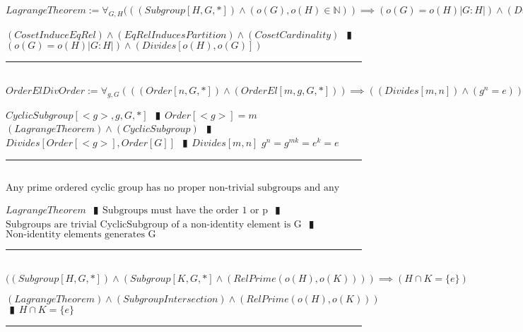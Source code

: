 \documentclass{book}
\newcommand{\abr}{:=}
\newcommand{\pipe}{$\phantom{(}\vrectangleblack\phantom{)}$}
\begin{document}
$LagrangeTheorem \abr \forall_{G, H}(((Subgroup[H, G, *]) \land (o(G), o(H) \in \mathbb{N})) \implies (o(G) = o(H) |G: H|) \land (Divides[o(H), o(G)])$
\begin{enumerate}
  \lit $(CosetInduceEqRel) \land (EqRelInducesPartition) \land (CosetCardinality)$ \pipe $(o(G) = o(H) |G: H|) \land (Divides[o(H), o(G)])$
\end{enumerate} \vspace{.75mm} \hrule \vspace{.75mm} \ \\ 

$OrderElDivOrder \abr \forall_{g, G}(((Order[n, G, *]) \land (OrderEl[m, g, G, *])) \implies ((Divides[m, n]) \land (g^n = e)))$
\begin{enumerate}
  \lit $CyclicSubgroup[<g>, g, G, *]$ \pipe $Order[<g>] = m$
  \lit $(LagrangeTheorem) \land (CyclicSubgroup)$ \pipe $Divides[Order[<g>], Order[G]]$ \pipe $Divides[m, n]$
  \lit $g^n = g^{m k} = e ^k = e$
\end{enumerate} \vspace{.75mm} \hrule \vspace{.75mm} \ \\ 

$\text{Any prime ordered cyclic group has no proper non-trivial subgroups and any non-identity element is a generator.}$
\begin{enumerate}
  \lit $LagrangeTheorem$ \pipe $\text{Subgroups must have the order 1 or p}$ \pipe $\text{Subgroups are trivial}$
  \lit $\text{CyclicSubgroup of a non-identity element is G}$ \pipe $\text{Non-identity elements generates G}$
\end{enumerate} \vspace{.75mm} \hrule \vspace{.75mm} \ \\ 

$((Subgroup[H, G, *]) \land (Subgroup[K, G, *] \land (RelPrime(o(H), o(K)))) \implies (H \cap K = \{e\})$
\begin{enumerate}
  \lit $(LagrangeTheorem) \land (SubgroupIntersection) \land (RelPrime(o(H), o(K)))$ \pipe $H \cap K = \{e\}$
\end{enumerate} \vspace{.75mm} \hrule \vspace{.75mm} \ \\ 
\end{document}
